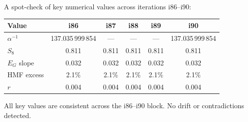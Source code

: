 \documentclass[11pt,a4paper]{article}
\begin{document}
A spot-check of key numerical values across iterations i86--i90:

\begin{center}
\begin{tabular}{lccccc}
\toprule
\textbf{Value} & \textbf{i86} & \textbf{i87} & \textbf{i88} & \textbf{i89} & \textbf{i90} \\
\midrule
$\alpha^{-1}$ & 137.035\,999\,854 & --- & --- & --- & 137.035\,999\,854 \\
$S_8$ & 0.811 & 0.811 & 0.811 & 0.811 & 0.811 \\
$E_G$ slope & 0.032 & 0.032 & 0.032 & 0.032 & 0.032 \\
HMF excess & 2.1\% & 2.1\% & 2.1\% & 2.1\% & 2.1\% \\
$r$ & 0.004 & 0.004 & 0.004 & 0.004 & 0.004 \\
\bottomrule
\end{tabular}
\end{center}

All key values are consistent across the i86--i90 block. No drift or contradictions detected.
\end{document}
